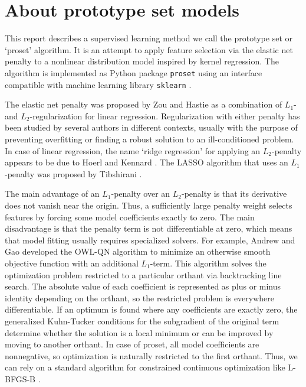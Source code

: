 \chapter{About prototype set models}
\label{ch_about}
%
This report describes a supervised learning method we call the prototype set or `proset' algorithm.
It is an attempt to apply feature selection via the elastic net penalty to a nonlinear distribution model inspired by kernel regression.
The algorithm is implemented as Python package \texttt{proset} using an interface compatible with machine learning library \texttt{sklearn} \cite{Pedregosa_11}.\par
%
The elastic net penalty was proposed by Zou and Hastie \cite{Zou_05} as a combination of $L_1$- and $L_2$-regularization for linear regression.
Regularization with either penalty has been studied by several authors in different contexts, usually with the purpose of preventing overfitting or finding a robust solution to an ill-conditioned problem.
In case of linear regression, the name `ridge regression' for applying an $L_2$-penalty appears to be due to Hoerl and Kennard \cite{Hoerl_70}.
The LASSO algorithm that uses an $L_1$-penalty was proposed by Tibshirani \cite{Tibshirani_96}.\par
%
The main advantage of an $L_1$-penalty over an $L_2$-penalty is that its derivative does not vanish near the origin.
Thus, a sufficiently large penalty weight selects features by forcing some model coefficients exactly to zero.
The main disadvantage is that the penalty term is not differentiable at zero, which means that model fitting usually requires specialized solvers.
For example, Andrew and Gao \cite{Andrew_07} developed the OWL-QN algorithm to minimize an otherwise smooth objective function with an additional $L_1$-term.
This algorithm solves the optimization problem restricted to a particular orthant via backtracking line search.
The absolute value of each coefficient is represented as plus or minus identity depending on the orthant, so the restricted problem is everywhere differentiable.
If an optimum is found where any coefficients are exactly zero, the generalized Kuhn-Tucker conditions for the subgradient of the original term determine whether the solution is a local minimum or can be improved by moving to another orthant.
In case of proset, all model coefficients are nonnegative, so optimization is naturally restricted to the first orthant.
Thus, we can rely on a standard algorithm for constrained continuous optimization like L-BFGS-B \cite{Byrd_95}.\par
